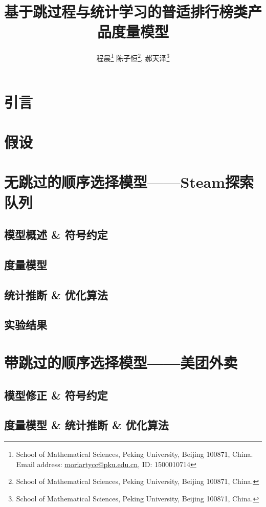 \documentclass[UTF8]{ctexart}
\begin{document}
	\setcounter{footnote}{1}
	\title{基于跳过程与统计学习的普适排行榜类产品度量模型}
	\author{程晨\footnote{School of Mathematical Sciences, Peking University, Beijing 100871, China. Email address:
			\href{mailto:moriartycc@pku.edu.cn}{moriartycc@pku.edu.cn}, ID: 1500010714} \quad 陈子恒\footnote{School of Mathematical Sciences, Peking University, Beijing 100871, China. }, \quad 郝天泽\footnote{School of Mathematical Sciences, Peking University, Beijing 100871, China. }}
	\date{}
	\maketitle
	\newpage
	\tableofcontents
	\newpage
	\section{引言}
	\section{假设}
	\section{无跳过的顺序选择模型——Steam探索队列}
	\subsection{模型概述 \& 符号约定}
	\subsection{度量模型}
	\subsection{统计推断 \& 优化算法}
	\subsection{实验结果}
	\section{带跳过的顺序选择模型——美团外卖}
	\subsection{模型修正 \& 符号约定}
	\subsection{度量模型 \& 统计推断 \& 优化算法}
\end{document}
